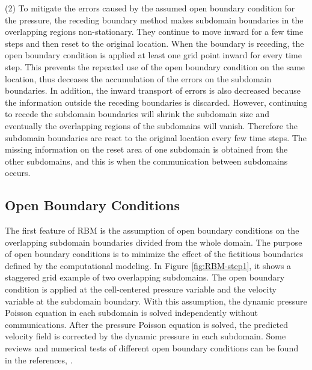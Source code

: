 (2) To mitigate the errors caused by the assumed open boundary condition for the pressure, the receding boundary method makes subdomain boundaries in the overlapping regions non-stationary. They continue to move inward for a few time steps and then reset to the original location. When the boundary is receding, the open boundary condition is applied at least one grid point inward for every time step. This prevents the repeated use of the open boundary condition on the same location, thus deceases the accumulation of the errors on the subdomain boundaries. In addition, the inward transport of errors is also decreased because the information outside the receding boundaries is discarded. However, continuing to recede the subdomain boundaries will shrink the subdomain size and eventually the overlapping regions of the subdomains will vanish. Therefore the subdomain boundaries are reset to the original location every few time steps. The missing information on the reset area of one subdomain is obtained from the other subdomains, and this is when the communication between subdomains occurs. %


\subsection{Open Boundary Conditions}
The first feature of RBM is the assumption of open boundary conditions on the overlapping subdomain boundaries divided from the whole domain. The purpose of open boundary conditions is to minimize the effect of the fictitious boundaries defined by the computational modeling. In Figure \ref{fig:RBM-step1}, it shows a staggered grid example of two overlapping subdomains. The open boundary condition is applied at the cell-centered pressure variable and the velocity variable at the subdomain boundary. With this assumption, the dynamic pressure Poisson equation in each subdomain is solved independently without communications. After the pressure Poisson equation is solved, the predicted velocity field is corrected by the dynamic pressure in each subdomain. Some reviews and numerical tests of different open boundary conditions can be found in the references, \cite{Sani1994, Jensen1998, Stevens1990, Camerlengo1980, Palma1998}.

